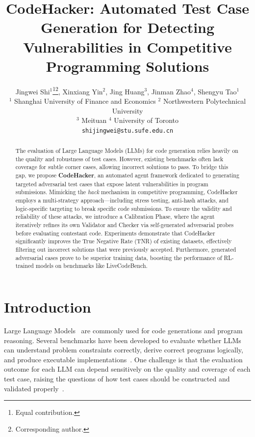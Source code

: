 \documentclass[11pt]{article}
\title{CodeHacker: Automated Test Case Generation for Detecting Vulnerabilities in Competitive Programming Solutions}
\author{Jingwei Shi$^{1}$\thanks{Equal contribution.}\thanks{Corresponding author.}, Xinxiang Yin$^{2}$\footnotemark[1], Jing Huang$^{3}$\footnotemark[1], Jinman Zhao$^{4}$, Shengyu Tao$^{1}$ \\
  $^1$ Shanghai University of Finance and Economics \quad
  $^2$ Northwestern Polytechnical University \\
  $^3$ Meituan \quad
  $^4$ University of Toronto \\
  \texttt{shijingwei@stu.sufe.edu.cn}
}
\begin{document}
\maketitle
\begin{abstract}
The evaluation of Large Language Models (LLMs) for code generation relies heavily on the quality and robustness of test cases. However, existing benchmarks often lack coverage for subtle corner cases, allowing incorrect solutions to pass. To bridge this gap, we propose \textbf{CodeHacker}, an automated agent framework dedicated to generating targeted adversarial test cases that expose latent vulnerabilities in program submissions. 
Mimicking the \emph{hack} mechanism in competitive programming, CodeHacker employs a multi-strategy approach—including stress testing, anti-hash attacks, and logic-specific targeting to break specific code submissions. 
To ensure the validity and reliability of these attacks, we introduce a Calibration Phase, where the agent iteratively refines its own Validator and Checker via self-generated adversarial probes before evaluating contestant code.
Experiments demonstrate that CodeHacker significantly improves the True Negative Rate (TNR) of existing datasets, effectively filtering out incorrect solutions that were previously accepted. Furthermore, generated adversarial cases prove to be superior training data, boosting the performance of RL-trained models on benchmarks like LiveCodeBench.
\end{abstract}
\section{Introduction}

Large Language Models~\cite[LLMs,][]{openai2024gpt4technicalreport,deepseekai2025deepseekv3technicalreport} are commonly used for code generations and program reasoning.
Several benchmarks have been developed to evaluate whether LLMs can understand problem constraints correctly, derive correct programs logically, and produce executable implementations~\cite{chen2021evaluatinglargelanguagemodels,Li_2022, wang2025openhandsopenplatformai}.  
One challenge is that the evaluation outcome for each LLM can depend sensitively on the quality and coverage of each test case, raising the questions of how test cases should be constructed and validated properly~\cite{NEURIPS2023_43e9d647}.
\end{document}
